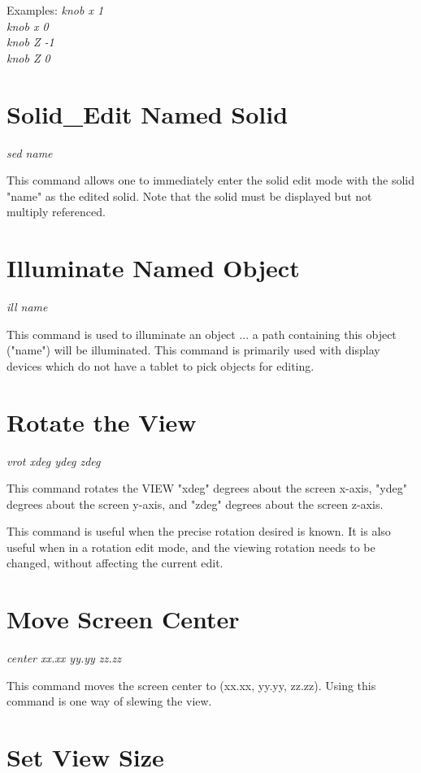 Examples:
{\em
       knob x 1 \\
       knob x 0 \\
       knob Z -1 \\
       knob Z 0 \\
}

\section{Solid\_Edit Named Solid}

{\em\center
sed name
}

This command allows one to immediately enter the solid edit mode
with the solid "name" as the edited solid.
Note that the solid must be displayed but not multiply referenced.

\section{Illuminate Named Object}

{\em\center
ill name
}

This command is used to illuminate an object ... a path containing this
object ("name") will be illuminated.
This command is primarily used with display devices which do not have
a tablet to pick objects for editing.

\section{Rotate the View}

{\em\center
vrot xdeg ydeg zdeg
}

This command rotates the VIEW "xdeg" degrees about the screen x-axis,
"ydeg" degrees about the screen y-axis, and "zdeg" degrees about the
screen z-axis.

This command is useful when the precise rotation desired is known.
It is also useful when in a rotation edit mode, and the viewing
rotation needs to be changed, without affecting the current edit.

\section{Move Screen Center}

{\em\center
center xx.xx yy.yy zz.zz
}

This command moves the screen center to (xx.xx, yy.yy, zz.zz).
Using this command is one way of slewing the view.

\section{Set View Size}

